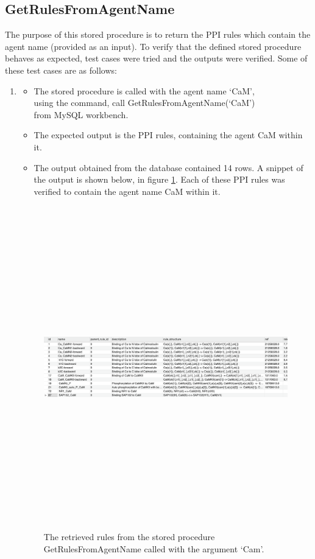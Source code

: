 \documentclass[msc,deptreport,ai]{infthesis}      %
\begin{document}
\subsection{GetRulesFromAgentName}
The purpose of this stored procedure is to return the PPI rules which contain the agent name (provided as an input). To verify that the defined stored procedure behaves as expected, test cases were tried and the outputs were verified. Some of these test cases are as follows: 
\begin{enumerate}
	\item 
	\begin{itemize}
		\item 	The stored procedure is called with the agent name `CaM',\\
		using the command, call GetRulesFromAgentName(`CaM') \\
		 from MySQL workbench.
		 \item 	The expected output is the PPI rules, containing the agent CaM within it.
		 \item 	The output obtained from the database contained 14 rows. A snippet of the output is shown below, in figure \ref{fig:AgentNameOutput1}. Each of these PPI rules was verified to contain the agent name CaM within it.\\
	\end{itemize}	
	\begin{figure}[H]
		\centering
		\captionsetup{justification=centering}
		\includegraphics[width=\linewidth,height=14cm,keepaspectratio]{AgentNameOutput1.png}	
		\caption{The retrieved rules from the stored procedure GetRulesFromAgentName called with the argument `Cam'.}
		\label{fig:AgentNameOutput1}		
	\end{figure}


\end{enumerate}
\end{document}
